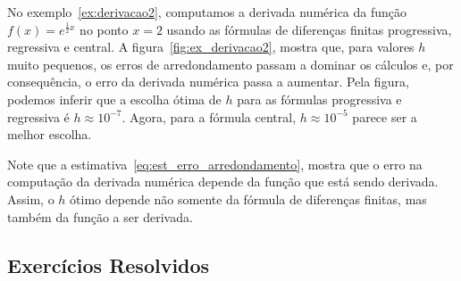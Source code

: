 \begin{ex}
No exemplo~\ref{ex:derivacao2}, computamos a derivada numérica da função $f(x)=e^{\frac{1}{2}x}$ no ponto $x=2$ usando as fórmulas de diferenças finitas progressiva, regressiva e central. A figura~\ref{fig:ex_derivacao2}, mostra que, para valores $h$ muito pequenos, os erros de arredondamento passam a dominar os cálculos e, por consequência, o erro da derivada numérica passa a aumentar. Pela figura, podemos inferir que a escolha ótima de $h$ para as fórmulas progressiva e regressiva é $h\approx 10^{-7}$. Agora, para a fórmula central, $h\approx 10^{-5}$ parece ser a melhor escolha.
\end{ex}

\begin{obs}
  Note que a estimativa~\eqref{eq:est_erro_arredondamento}, mostra que o erro na computação da derivada numérica depende da função que está sendo derivada. Assim, o $h$ ótimo depende não somente da fórmula de diferenças finitas, mas também da função a ser derivada.
\end{obs}

\subsection*{Exercícios Resolvidos}


